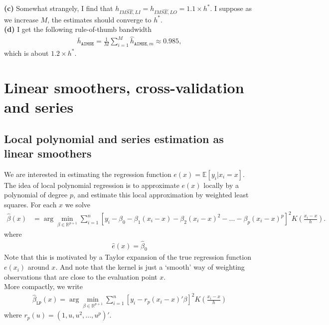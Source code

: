 \documentclass[12pt]{article}
\newcommand{\R}{\mathbb{R}}
\newcommand{\E}{\mathbb{E}}
\newcommand{\mtx}[1]{\ensuremath{\bm{\mathit{#1}}}}
\begin{document}
\textbf{(c)} Somewhat strangely, I find that $h_{\widehat{IMSE,LI}}=h_{\widehat{IMSE,LO}} = 1.1 \times h^*$. I suppose as we increase $M$, the estimates should converge to $h^*$.\\

\textbf{(d)} I get the following rule-of-thumb bandwidth
\begin{align*}
\bar{h}_{\texttt{AIMSE}} = \frac{1}{M} \sum_{i=1}^M \hat{h}_{\texttt{AIMSE},m} \approx 0.985,
\end{align*}
which is about $1.2 \times h^*$.

\newpage

\section{Linear smoothers, cross-validation and series}

\subsection{Local polynomial and series estimation as linear smoothers} We are interested in estimating the regression function $e(x) = \E[y_i | x_i = x]$. The idea of local polynomial regression is to approximate $e(x)$ locally by a polynomial of degree $p$, and estimate this local approximation by weighted least squares. For each $x$ we solve
\begin{align*}
\hat{\mtx{\beta}}(x) &= \arg \min_{\beta \in \R^{p+1}}\sum_{i=1}^n[y_i - \beta_0 - \beta_1(x_i-x) - \beta_2(x_i-x)^2 -...-\beta_p(x_i-x)^p]^2K\left(\frac{x_i - x}{h}\right).
\end{align*}
where
\begin{align*}
\hat e(x) = \hat \beta_0
\end{align*}
Note that this is motivated by a Taylor expansion of the true regression function $e(x_i)$ around $x$. And note that the kernel is just a `smooth' way of weighting observations that are close to the evaluation point $x$.\\

More compactly, we write
\begin{align*}
\hat{\mtx{\beta}}_{\texttt{LP}}(x)  = \arg \min_{\beta \in \R^{p+1}}\sum_{i=1}^n [y_i - \mtx{r}_p(x_i - x)'\mtx{\beta}]^2K\left(\frac{x_i - x}{h}\right)
\end{align*}
where $\mtx{r}_p(u)= (1 , u , u^2 ,...,u^p)'$. \\
\end{document}
